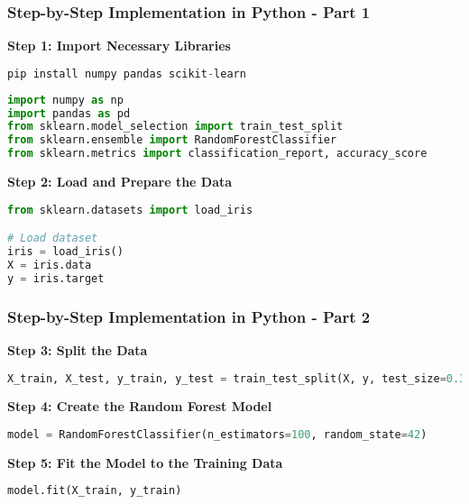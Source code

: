 \documentclass[aspectratio=169]{beamer}
\begin{document}
\begin{frame}[fragile]
    \frametitle{Step-by-Step Implementation in Python - Part 1}
    \textbf{Step 1: Import Necessary Libraries}
    
    \begin{lstlisting}[language=Python]
pip install numpy pandas scikit-learn
    \end{lstlisting}
    
    \begin{lstlisting}[language=Python]
import numpy as np
import pandas as pd
from sklearn.model_selection import train_test_split
from sklearn.ensemble import RandomForestClassifier
from sklearn.metrics import classification_report, accuracy_score
    \end{lstlisting}

    \textbf{Step 2: Load and Prepare the Data}
    
    \begin{lstlisting}[language=Python]
from sklearn.datasets import load_iris

# Load dataset
iris = load_iris()
X = iris.data
y = iris.target
    \end{lstlisting}
\end{frame}

\begin{frame}[fragile]
    \frametitle{Step-by-Step Implementation in Python - Part 2}
    \textbf{Step 3: Split the Data}
    
    \begin{lstlisting}[language=Python]
X_train, X_test, y_train, y_test = train_test_split(X, y, test_size=0.3, random_state=42)
    \end{lstlisting}

    \textbf{Step 4: Create the Random Forest Model}
    
    \begin{lstlisting}[language=Python]
model = RandomForestClassifier(n_estimators=100, random_state=42)
    \end{lstlisting}

    \textbf{Step 5: Fit the Model to the Training Data}
    
    \begin{lstlisting}[language=Python]
model.fit(X_train, y_train)
    \end{lstlisting}
\end{frame}
\end{document}
